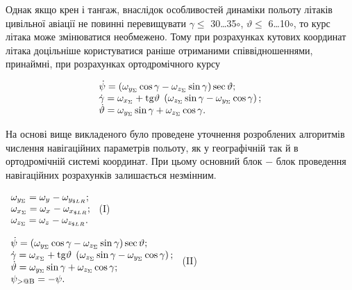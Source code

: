 Однак якщо крен і тангаж, внаслідок особливостей динаміки польоту літаків цивільної 
авіації не повинні перевищувати \textbar $\gamma$\textbar   $\leq$  30\dots 35$\circ$, 
\textbar $\vartheta$\textbar  $\leq$  6\dots 10$\circ$, то курс літака може змінюватися 
необмежено. Тому при розрахунках кутових координат літака доцільніше користуватися 
раніше отриманими співвідношеннями, принаймні, при розрахунках ортодромічного курсу 



\[\begin{array}{l} 
{\dot{\psi }=\left(\omega_{y_{\Sigma } } \cos \gamma -\omega_{z_{\Sigma } } \sin 
\gamma \right)\sec \vartheta ;} \\ {\dot{\gamma }=\omega_{x_{\Sigma } } +{\rm tg}
\vartheta {\rm \; }\left(\omega_{z_{\Sigma } } \sin \gamma -\omega_{y_{\Sigma } 
} \cos \gamma \right);} \\ {\dot{\vartheta }=\omega_{y_{\Sigma } } \sin \gamma +
\omega_{z_{\Sigma }} \cos \gamma .} \end{array}\] 

На основі вище викладеного було проведене уточнення розроблених алгоритмів числення 
навігаційних параметрів польоту, як у географічній так й в ортодромічній системі 
координат. При цьому основний блок $-$ блок проведення навігаційних розрахунків залишається 
незмінним.



$\begin{array}{l} {\omega_{y_{\Sigma } } =\omega_{y_{{\rm }} } -\omega_{y_{\$ 
LR} } ;} \\ {\omega_{x_{\Sigma } } =\omega_{x_{{\rm }} } -\omega_{x_{\$ LR} } 
;} \\ {\omega_{z_{\Sigma } } =\omega_{z_{{\rm }} } -\omega_{z_{\$ LR} } .} \end{array}$                                                      (I)



$\begin{array}{l} 
{\dot{\psi }=\left(\omega_{y_{\Sigma } } \cos \gamma -\omega_{z_{\Sigma } } \sin 
\gamma \right)\sec \vartheta ;} \\ {\dot{\gamma }=\omega_{x_{\Sigma } } +{\rm tg}
\vartheta {\rm \; }\left(\omega_{z_{\Sigma } } \sin \gamma -\omega_{y_{\Sigma } 
} \cos \gamma \right);} \\ {\dot{\vartheta }=\omega_{y_{\Sigma } } \sin \gamma +
\omega_{z_{\Sigma }} \cos \gamma ;} \\ {\psi_{{\rm >@B}} =-\psi .} \end{array}$                                              (II)



